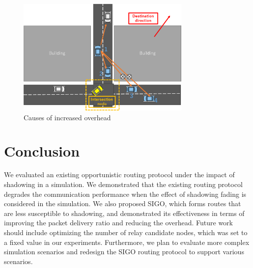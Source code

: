 \documentclass[conference]{IEEEtran}
\begin{document}
\begin{figure}[!ht]
\centering
\includegraphics[width=85mm]{figures/overhead_reason.eps}
\caption{Causes of increased overhead}
\label{fig:overhead_reason}
\end{figure}



\section{Conclusion}
\label{conclusion}
We evaluated an existing opportunistic routing protocol under the impact of shadowing in a simulation. We demonstrated that the existing routing protocol degrades the communication performance when the effect of shadowing fading is considered in the simulation. 
We also proposed SIGO, which forms routes that are less susceptible to shadowing, and demonstrated its effectiveness in terms of improving the packet delivery ratio and reducing the overhead. 
Future work should include optimizing the number of relay candidate nodes, which was set to a fixed value in  our experiments. Furthermore, we plan to evaluate more complex simulation scenarios and redesign the SIGO routing protocol to support  various scenarios.



\end{document}
